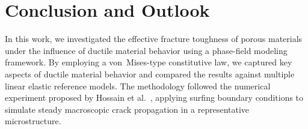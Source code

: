 \documentclass[pdflatex,sn-mathphys-num]{sn-jnl}%
\newcommand{\vMLabel}{\textbf{vM}\xspace}
\theoremstyle{thmstyleone}%
\theoremstyle{thmstyletwo}%
\theoremstyle{thmstylethree}%
\begin{document}




\section{Conclusion and Outlook}

In this work, we investigated the effective fracture toughness of porous materials under the
influence of ductile material behavior using a phase-field modeling framework. By employing a
von~Mises-type constitutive law, we captured key aspects of ductile material behavior and
compared the results against multiple linear elastic reference models. The methodology followed
the numerical experiment proposed by Hossain et al.~\cite{hossain_effective_2014}, applying
surfing boundary conditions to simulate steady macroscopic crack propagation in a representative
microstructure.
\end{document}
